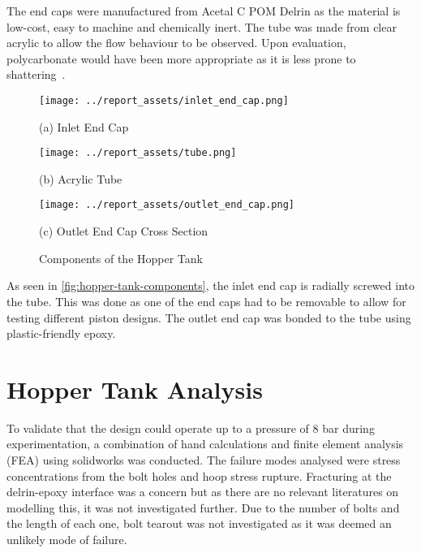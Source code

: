 The end caps were manufactured from Acetal C POM Delrin as the material is low-cost, easy to machine and chemically inert. The tube was made from clear acrylic to allow the flow behaviour to be observed. Upon evaluation, polycarbonate would have been more appropriate as it is less prone to shattering~\cite{SADEGHIESFAHLANI2021e06856}.
\begin{figure}[htbp]
    \centering

    \begin{minipage}{0.3\textwidth}
        \centering
        \texttt{[image: ../report\_assets/inlet\_end\_cap.png]}
        \caption*{(a) Inlet End Cap}
    \end{minipage}
    \hfill
    \begin{minipage}{0.3\textwidth}
        \centering
        \texttt{[image: ../report\_assets/tube.png]}
        \caption*{(b) Acrylic Tube}
    \end{minipage}
    \hfill
    \begin{minipage}{0.3\textwidth}
        \centering
        \texttt{[image: ../report\_assets/outlet\_end\_cap.png]}
        \caption*{(c) Outlet End Cap Cross Section}
    \end{minipage}
    \caption{Components of the Hopper Tank}\label{fig:hopper-tank-components}
\end{figure}
As seen in \autoref{fig:hopper-tank-components}, the inlet end cap is radially screwed into the tube. This was done as one of the end caps had to be removable to allow for testing different piston designs. The outlet end cap was bonded to the tube using plastic-friendly epoxy.
\section{Hopper Tank Analysis}
To validate that the design could operate up to a pressure of 8 bar during experimentation, a combination of hand calculations and finite element analysis (FEA) using solidworks was conducted. The failure modes analysed were stress concentrations from the bolt holes and hoop stress rupture. Fracturing at the delrin-epoxy interface was a concern but as there are no relevant literatures on modelling this, it was not investigated further. Due to the number of bolts and the length of each one, bolt tearout was not investigated as it was deemed an unlikely mode of failure.


